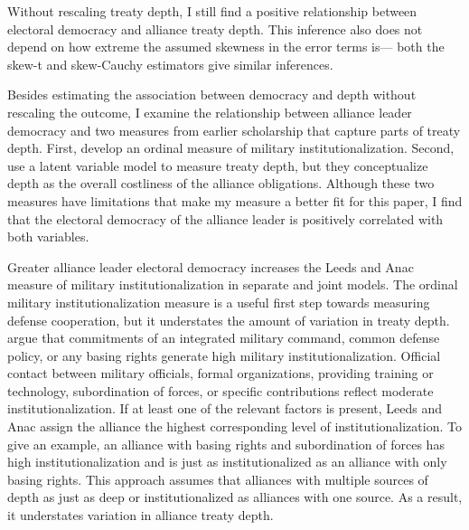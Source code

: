 \documentclass[12pt]{article}
\begin{document}
Without rescaling treaty depth, I still find a positive relationship between electoral democracy and alliance treaty depth. 
This inference also does not depend on how extreme the assumed skewness in the error terms is--- both the skew-t and skew-Cauchy estimators give similar inferences.  


Besides estimating the association between democracy and depth without rescaling the outcome, I examine the relationship between alliance leader democracy and two measures from earlier scholarship that capture parts of treaty depth. 
First, \citet{LeedsAnac2005} develop an ordinal measure of military institutionalization.
Second, \citet{BensonClinton2016} use a latent variable model to measure treaty depth, but they conceptualize depth as the overall costliness of the alliance obligations. 
Although these two measures have limitations that make my measure a better fit for this paper, I find that the electoral democracy of the alliance leader is positively correlated with both variables.


Greater alliance leader electoral democracy increases the Leeds and Anac measure of military institutionalization in separate and joint models.
The ordinal military institutionalization measure is a useful first step towards measuring defense cooperation, but it understates the amount of variation in treaty depth. 
\citet{LeedsAnac2005} argue that commitments of an integrated military command, common defense policy, or any basing rights generate high military institutionalization. 
Official contact between military officials, formal organizations, providing training or technology, subordination of forces, or specific contributions reflect moderate institutionalization. 
If at least one of the relevant factors is present, Leeds and Anac assign the alliance the highest corresponding level of institutionalization. 
To give an example, an alliance with basing rights and subordination of forces has high institutionalization and is just as institutionalized as an alliance with only basing rights. 
This approach assumes that alliances with multiple sources of depth as just as deep or institutionalized as alliances with one source.
As a result, it understates variation in alliance treaty depth.
\end{document}
